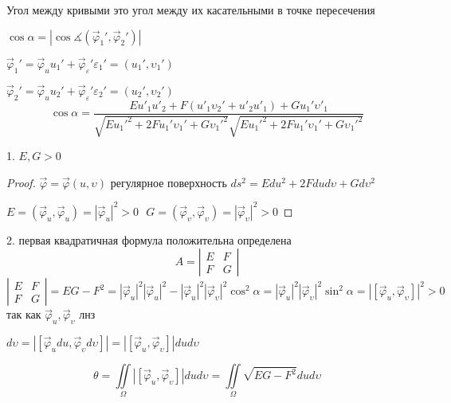 Угол между кривыми это угол между их касательными в точке пересечения

$\cos \alpha = |\cos \measuredangle (\vec \varphi_1', \vec \varphi_2')|$

$\vec \varphi_1' = \vec \varphi_u u_1' + \vec \varphi_{\varepsilon}'
\varepsilon_1' = (u_1', \upsilon_1')$

$\vec \varphi_2' = \vec \varphi_u u_2' + \vec \varphi_{\varepsilon}'
\varepsilon_2' = (u_2', \upsilon_2')$
$$
\cos \alpha = \frac{Eu'_1 u'_2 + F(u'_1\upsilon_2' + u'_2 u'_1) + Gu_1'
\upsilon'_1}
{\sqrt{Eu_1'^2 + 2Fu_1'\upsilon_1' + G\upsilon_1'^2}
\sqrt{Eu_1'^2 + 2Fu_1'\upsilon_1' + G\upsilon_1'^2}}
$$

\begin{block}[Свойства]
  1. $E,G > 0$

  \begin{proof}
    $\vec \varphi = \vec \varphi (u, \upsilon)$ регулярное поверхность
    $ds^2 = Edu^2 + 2Fdud\upsilon + Gd\upsilon^2$

    $E = (\vec \varphi_u, \vec \varphi_u) = |\vec \varphi_u|^2 > 0 ~~~
    G = (\vec \varphi_{\upsilon}, \vec \varphi_{\upsilon}) =
    |\vec \varphi_{\upsilon}|^2 > 0$
  \end{proof}

  2. первая квадратичная формула положительна определена
  $$
  A =
  \left|
  \begin{array}{cc}
    E & F \\
    F & G
  \end{array}
  \right|
  $$
  $$
  \left|
  \begin{array}{cc}
    E & F \\
    F & G
  \end{array}
  \right|
  = EG - F^2 = |\vec \varphi_u|^2|\vec \varphi_u|^2 - |\vec \varphi_u|^2
  |\vec \varphi_{\upsilon}|^2 \cos^2 \alpha = |\vec \varphi_u|^2
  |\vec \varphi_{\upsilon}|^2 \sin^2 \alpha = |[\vec \varphi_u, \vec
  \varphi_{\upsilon}]|^2 > 0
  $$
  так как $\vec \varphi_u, \vec \varphi_{\upsilon}$ лнз
\end{block}

\begin{block}
  $d\upsilon = |[\vec \varphi_u du, \vec \varphi_{\upsilon} d\upsilon]| =
  |[\vec \varphi_u, \vec \varphi_{\upsilon}]| du d\upsilon$

  $$
  \theta = \iint \limits_{\Omega} |[\vec \varphi_u, \vec \varphi_{\upsilon}]|
  du d\upsilon = \iint \limits_{\Omega} \sqrt{EG - F^2}dud\upsilon
  $$
\end{block}

